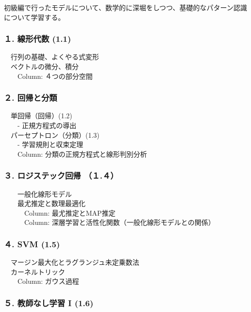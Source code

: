 \documentclass[
]{ltjarticle}
\begin{document}
初級編で行ったモデルについて、数学的に深堀をしつつ、基礎的なパターン認識について学習する。

\hypertarget{ux7ddaux5f62ux4ee3ux6570-1.1}{%
\subsubsection{１. 線形代数 (1.1)}\label{ux7ddaux5f62ux4ee3ux6570-1.1}}

　行列の基礎、よくやる式変形\\
　ベクトルの微分、積分\\
　　Column: ４つの部分空間

\hypertarget{ux56deux5e30ux3068ux5206ux985e}{%
\subsubsection{２. 回帰と分類}\label{ux56deux5e30ux3068ux5206ux985e}}

　単回帰（回帰）(1.2)\\
　　- 正規方程式の導出\\
　パーセプトロン（分類）(1.3)\\
　　- 学習規則と収束定理\\
　　Column: 分類の正規方程式と線形判別分析

\hypertarget{ux30edux30b8ux30b9ux30c6ux30c3ux30afux56deux5e30-uxff11.uxff14}{%
\subsubsection{３. ロジステック回帰
（１.４）}\label{ux30edux30b8ux30b9ux30c6ux30c3ux30afux56deux5e30-uxff11.uxff14}}

　　一般化線形モデル\\
　　最尤推定と数理最適化\\
　　　Column: 最尤推定とMAP推定\\
　　　Column: 深層学習と活性化関数（一般化線形モデルとの関係）

\hypertarget{svm-1.5}{%
\subsubsection{４. SVM (1.5)}\label{svm-1.5}}

　マージン最大化とラグランジュ未定乗数法\\
　カーネルトリック\\
　　Column: ガウス過程

\hypertarget{ux6559ux5e2bux306aux3057ux5b66ux7fd2-i-1.6}{%
\subsubsection{５. 教師なし学習 I
(1.6)}\label{ux6559ux5e2bux306aux3057ux5b66ux7fd2-i-1.6}}
\end{document}
